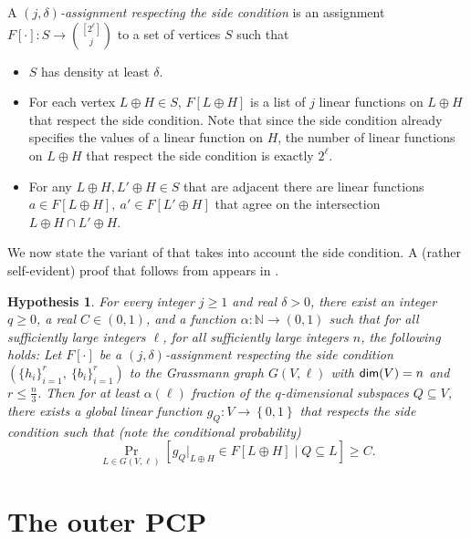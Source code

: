 \documentclass{toc}
\newtheorem{conj}[theorem]{Hypothesis}
\newcommand\set[1]{{\left\{ #1 \right\}}}
\newcommand\Prob[2]{{\Pr_{#1}\left[ {#2} \right]}}
\newcommand*\xor{\mathbin{\oplus}}
\newcommand*\aconj[1]{\alpha{#1}}
\renewcommand\leq{\leqslant}
\begin{document}
A \emph{$(j,\delta)$-assignment respecting the side condition} %
%
 is an assignment $F[\cdot]: S \to {[2^\ell] \choose j}$ to a set of
vertices $S$ such that
\begin{itemize}
\item $S$ has density at least $\delta$.
\item For each vertex $L\xor H \in S$, $F[L\xor H]$ is a list of $j$ linear functions
on $L \xor H$ that respect the side condition. Note that since the side condition already specifies the values
of a linear function on $H$, the number of linear functions on $L\xor H$ that respect the side condition is
exactly $2^\ell$.
\item For any $L\xor H, L' \xor H \in S$ that are %
adjacent  %
there are linear functions
      $a \in F[L \xor H], ~a' \in F[L' \xor H]$ that agree on the intersection $L\xor H \cap L' \xor H$.
\end{itemize}

We now state the variant of  that takes into account the side condition. A (rather self-evident) proof that
 follows from  appears in .
%
%
%

\begin{conj}\label{conj:main}
  For every integer $j \geqslant 1$ and %
real  %
$\delta>0$, there exist an integer $q \geqslant 0$, a %
real  %
$C \in (0,1)$, and a
  function $\aconj\colon \mathbb{N}\to(0,1)$
  such that
  for all sufficiently large integers $\ell$, for all sufficiently large integers $n$,  the following holds:
  Let $F[\cdot]$ be a $(j,\delta)$-assignment respecting the side condition $\left( \{ h_i \}_{i=1}^r, ~\{b_i\}_{i=1}^r \right)$
  to the Grassmann graph $G(V,\ell)$ with ${\sf dim}(V) = n$ and $r \leq \frac{n}{3}$.
  Then for at least $\aconj{(\ell)}$ fraction of the $q$-dimensional subspaces $Q \subseteq V$,
  there exists a global linear function $g_Q: V \to \set{0,1}$ that respects the side condition
  such that (note the conditional probability)
  \begin{equation} \label{eqn:global-fn-side} 
  \Prob{L \in G(V, \ell)}{g_Q|_{L\xor H}  \in F[L\xor H] \mid Q \subseteq L}\geqslant C.
  \end{equation}
\end{conj}




\section{The outer PCP}\label{section:outer_pcp_game}
\end{document}

